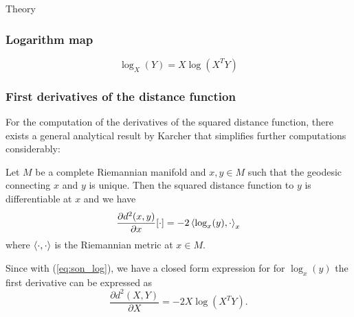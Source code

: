 \begin{chapter}{Theory}
\subsubsection{Logarithm map} %
\label{ssub:LogarithmSO}
\begin{equation}
    \label{eq:son_log}
    \log_X(Y)=X\log(X^TY)
\end{equation}


\subsubsection{First derivatives of the distance function} %
\label{ssub:FirstDerSO}
For the computation of the derivatives of the squared distance function, there exists a general analytical result by Karcher\cite{Karcher} that simplifies further
computations considerably:
\begin{theorem}[Karcher]
\label{thm:karcher_theorem}
Let $M$ be a complete Riemannian manifold and $x,y\in M$ such that the geodesic connecting $x$ and $y$ is unique. Then the squared distance function to $y$
is differentiable at $x$ and we have
\begin{equation}
    \frac{\partial d^2(x,y)}{\partial x}[\cdot] = -2\left\langle \log_x(y),\cdot \right\rangle_{x}
\end{equation}
where $\left\langle \cdot,\cdot \right\rangle$ is the Riemannian metric at $x\in M$.
\end{theorem}

Since with (\ref{eq:son_log}), we have a closed form expression for for $\log_x(y)$ the first derivative can be expressed as
\begin{equation}
    \frac{\partial d^2(X,Y)}{\partial X} = -2X\log(X^TY).
\end{equation}


\end{chapter}
